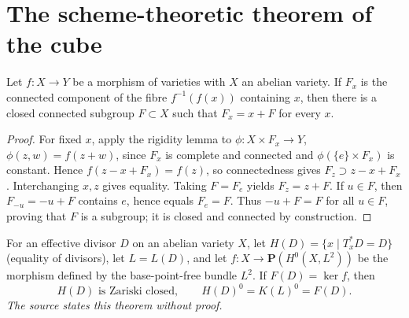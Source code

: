 
\section{The scheme-theoretic theorem of the cube}
\label{mumford-III10-source}

\begin{proposition}
\label{mumford-prop-abelian-fibre-kernel}
Let $f:X\to Y$ be a morphism of varieties with $X$ an abelian variety. If
$F_x$ is the connected component of the fibre $f^{-1}(f(x))$ containing $x$,
then there is a closed connected subgroup $F\subset X$ such that
$F_x=x+F$ for every $x$.
\end{proposition}
\begin{proof}
For fixed $x$, apply the rigidity lemma to
$\phi:X\times F_x\to Y$, $\phi(z,w)=f(z+w)$, since $F_x$ is complete and
connected and $\phi(\{e\}\times F_x)$ is constant. Hence
$f(z-x+F_x)=f(z)$, so connectedness gives
$F_z\supset z-x+F_x$. Interchanging $x,z$ gives equality. Taking
$F=F_e$ yields $F_z=z+F$. If $u\in F$, then
$F_{-u}=-u+F$ contains $e$, hence equals $F_e=F$. Thus $-u+F=F$ for all
$u\in F$, proving that $F$ is a subgroup; it is closed and connected by
construction.
\end{proof}

\begin{theorem}
\label{mumford-thm-effective-divisor-stabilizer}
For an effective divisor $D$ on an abelian variety $X$, let
$H(D)=\{x\mid T_x^*D=D\}$ (equality of divisors), let $L=L(D)$, and let
$f:X\to\mathbf P(H^0(X,L^2))$ be the morphism defined by the base-point-free
bundle $L^2$. If $F(D)=\ker f$, then
\[
H(D)\text{ is Zariski closed},\qquad H(D)^0=K(L)^0=F(D).
\]
\emph{The source states this theorem without proof.}
\end{theorem}

